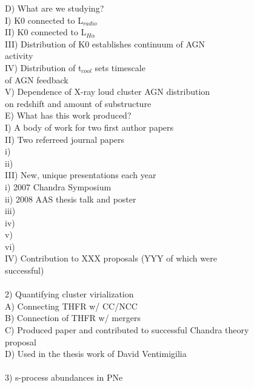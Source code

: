 \documentclass[12pt]{article}
\begin{document}
\begin{tabbing}
\>	D) What are we studying?\\
\>\>\>		I)   K0 connected to L$_{radio}$\\
\>\>\>		II)  K0 connected to L$_{H\alpha}$\\
\>\>\>		III) Distribution of K0 establishes continuum of AGN\\
\>\>\>\>	     activity\\
\>\>\>		IV)  Distribution of t$_{cool}$ sets timescale\\
\>\>\>\>	     of AGN feedback\\
\>\>\>		V)   Dependence of X-ray loud cluster AGN distribution\\
\>\>\>\>	     on redshift and amount of substructure\\
\>	E) What has this work produced?\\
\>\>\>		I) A body of work for two first author papers\\
\>\>\>		II)   Two referreed journal papers\\
\>\>\>\>		i)   \cite{2007AJ....134...14D}\\
\>\>\>\>		ii)  \cite{2006ApJ...643..730D}\\
\>\>\>		III)  New, unique presentations each year\\
\>\>\>\>		i)   2007 Chandra Symposium\\
\>\>\>\>		ii)  2008 AAS thesis talk and poster\\
\>\>\>\>		iii) \cite{2006AAS...209.7711D}\\
\>\>\>\>		iv)  \cite{2005AAS...20713903C}\\
\>\>\>\>		v)   \cite{2004AAS...20514715C}\\
\>\>\>\>		vi)  \cite{2004AAS...205.6020D}\\
\>\>\>		IV)  Contribution to XXX proposals (YYY of which were\\
\>\>\>\>	     successful)\\
\\
2) Quantifying cluster virialization\\
\>	A) Connecting THFR w/ CC/NCC\\
\>	B) Connection of THFR w/ mergers\\
\>	C) Produced paper and contributed to successful Chandra theory\\
\>\>	   proposal\\
\>	D) Used in the thesis work of David Ventimigilia\\
\\
3) s-process abundances in PNe\\

\end{tabbing}
\end{document}
